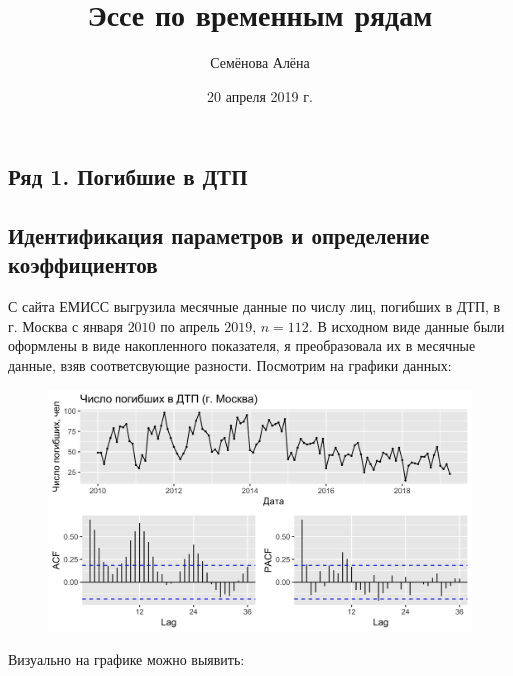 \documentclass[14pt, a4paper]{extarticle}\usepackage[]{graphicx}\usepackage[]{color}
\author{Семёнова Алёна}
\title{Эссе по временным рядам}
\date{20 апреля 2019 г.}
\makeatletter
\def\maxwidth{ %
  \ifdim\Gin@nat@width>\linewidth
    \linewidth
  \else
    \Gin@nat@width
  \fi
}
\newenvironment{knitrout}{}{} %
\makeatother
\begin{document}
\maketitle




\begin{center}
\section{Ряд 1. Погибшие в ДТП}
\subsection{Идентификация параметров и определение коэффициентов}
\end{center}

С сайта ЕМИСС выгрузила месячные данные по числу лиц, погибших в ДТП, в г. Москва с января $2010$ по апрель $2019$, $n = 112$. В исходном виде данные были оформлены в виде накопленного показателя, я преобразовала их в месячные данные, взяв соответсвующие разности. 
Посмотрим на графики данных:

\begin{figure}[H]
\begin{knitrout}
\color{fgcolor}

{\centering \includegraphics[width=\maxwidth]{figure/unnamed-chunk-1-1} 

}



\end{knitrout}
\end{figure}

Визуально на графике можно выявить:
\end{document}
